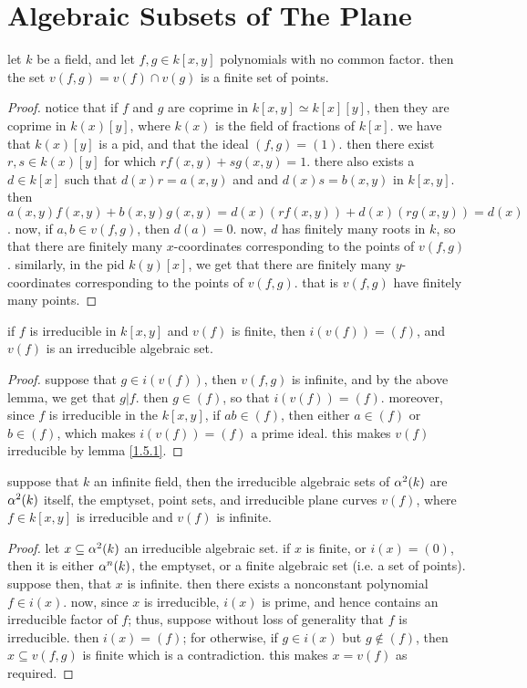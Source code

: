 \section{Algebraic Subsets of The Plane}\label{section_1.6}

\begin{lemma}\label{1.6.1}
    let $k$ be a field, and let $f,g \in k[x,y]$ polynomials with no common
    factor. then the set $v(f,g)=v(f) \cap v(g)$ is a finite set of points.
\end{lemma}
\begin{proof}
    notice that if $f$ and $g$ are coprime in $k[x,y] \simeq k[x][y]$, then they
    are coprime in $k(x)[y]$, where $k(x)$ is the field of fractions of $k[x]$.
    we have that $k(x)[y]$ is a pid, and that the ideal $(f,g)=(1)$. then there
    exist $r,s \in k(x)[y]$ for which $rf(x,y)+sg(x,y)=1$. there also exists a
    $d \in k[x]$ such that $d(x)r=a(x,y)$ and and $d(x)s=b(x,y)$ in $k[x,y]$.
    then $a(x,y)f(x,y)+b(x,y)g(x,y)=d(x)(rf(x,y))+d(x)(rg(x,y))=d(x)$. now, if
    $a,b \in v(f,g)$, then $d(a)=0$. now, $d$ has finitely many roots in $k$, so
    that there are finitely many $x$-coordinates corresponding to the points of
    $v(f,g)$. similarly, in the pid $k(y)[x]$, we get that there are finitely
    many $y$-coordinates corresponding to the points of $v(f,g)$. that is
    $v(f,g)$ have finitely many points.
\end{proof}
\begin{corollary}
    if $f$ is irreducible in $k[x,y]$ and $v(f)$ is finite, then $i(v(f))=(f)$,
    and $v(f)$ is an irreducible algebraic set.
\end{corollary}
\begin{proof}
    suppose that $g \in i(v(f))$, then $v(f,g)$ is infinite, and by the above
    lemma, we get that $g|f$. then $g \in (f)$, so that $i(v(f))=(f)$. moreover,
    since $f$ is irreducible in the $k[x,y]$, if $ab \in (f)$, then either $a
    \in (f)$ or $b \in (f)$, which makes $i(v(f))=(f)$ a prime ideal. this makes
    $v(f)$ irreducible by lemma \ref{1.5.1}.
\end{proof}
\begin{corollary}
    suppose that $k$ an infinite field, then the irreducible algebraic sets of
    $\alpha^2(k)$ are $\alpha^2(k)$ itself, the emptyset, point sets, and irreducible
    plane curves $v(f)$, where $f \in k[x,y]$ is irreducible and $v(f)$ is
    infinite.
\end{corollary}
\begin{proof}
    let $x \subseteq \alpha^2(k)$ an irreducible algebraic set. if $x$ is finite, or
    $i(x)=(0)$, then it is either $\alpha^n(k)$, the emptyset, or a finite algebraic
    set (i.e. a set of points). suppose then, that $x$ is infinite. then there
    exists a nonconstant polynomial $f \in i(x)$. now, since $x$ is irreducible,
    $i(x)$ is prime, and hence contains an irreducible factor of $f$; thus,
    suppose without loss of generality that $f$ is irreducible. then $i(x)=(f)$;
    for otherwise, if $g \in i(x)$ but $g \not\in (f)$, then $x \subseteq
    v(f,g)$ is finite which is a contradiction. this makes $x=v(f)$ as required.
\end{proof}
